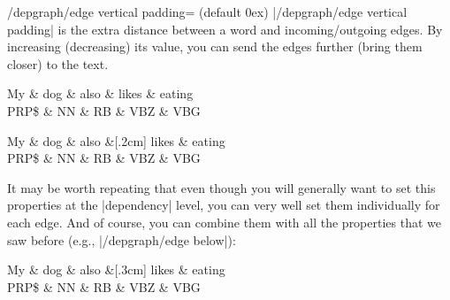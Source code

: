 \documentclass[a4paper]{ltxdoc}
\begin{document}
\begin{key}{/depgraph/edge vertical padding= (default 0ex)}
   |/depgraph/edge vertical padding| is the extra distance between a word and incoming/outgoing edges. By increasing (decreasing) its value, you can send the edges further (bring them closer) to the text.
\begin{codeexample}[]
\begin{dependency}[edge vertical padding=-.5ex] %
   \begin{deptext}[column sep=.7cm]
      My \& dog \& also \& likes \& eating \\
      PRP\$ \& NN \& RB \& VBZ \& VBG \\
   \end{deptext}
\end{dependency}
\quad
\begin{dependency}[edge vertical padding=1ex] %
   \begin{deptext}[column sep=.7cm]
      My \& dog \& also \&[.2cm] likes \& eating \\
      PRP\$ \& NN \& RB \& VBZ \& VBG \\
   \end{deptext}
\end{dependency}
\end{codeexample}
\end{key}

It may be worth repeating that even though you will generally want to set this properties at the |dependency| level, you can very well set them individually for each edge. And of course, you can combine them with all the properties that we saw before (e.g., |/depgraph/edge below|):
\begin{codeexample}[]
\begin{dependency}[edge vertical padding=.5ex]
   \begin{deptext}[column sep=.7cm]
      My \& dog \& also \&[.3cm] likes \& eating \\
      PRP\$ \& NN \& RB \& VBZ \& VBG \\
   \end{deptext}
\end{dependency}
\end{codeexample}
\end{document}
